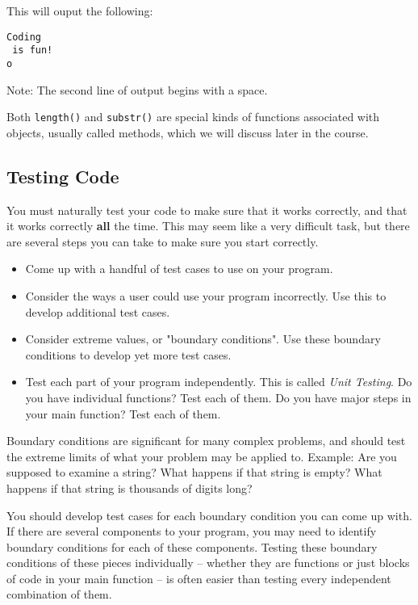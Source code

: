 This will ouput the following:

\begin{verbatim}
Coding
 is fun!
o
\end{verbatim}


Note: The second line of output begins with a space.

Both \texttt{length()} and \texttt{substr()} are special kinds of functions associated with objects, usually called methods, which we will discuss later in the course.

\subsection{Testing Code}
You must naturally test your code to make sure that it works correctly, and that it works correctly \textbf{all} the time. This may seem like a very difficult task, but there are several steps you can take to make sure you start correctly.

\begin{itemize}
    \item Come up with a handful of test cases to use on your program. 
    \item Consider the ways a user could use your program incorrectly. Use this to develop additional test cases.
    \item Consider extreme values, or "boundary conditions". Use these boundary conditions to develop yet more test cases.
    \item Test each part of your program independently. This is called \textit{Unit Testing}. Do you have individual functions? Test each of them. Do you have major steps in your main function? Test each of them.
\end{itemize}

Boundary conditions are significant for many complex problems, and should test the extreme limits of what your problem may be applied to. Example: Are you supposed to examine a string? What happens if that string is empty? What happens if that string is thousands of digits long? 

You should develop test cases for each boundary condition you can come up with. If there are several components to your program, you may need to identify boundary conditions for each of these components. Testing these boundary conditions of these pieces individually -- whether they are functions or just blocks of code in your main function -- is often easier than testing every independent combination of them. 

